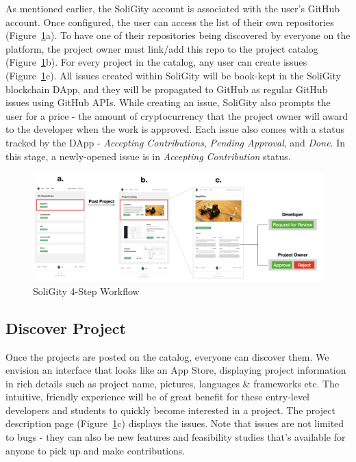 \documentclass[12pt]{article}
\renewcommand{\_}{\kern-1.5pt\textunderscore\kern-1.5pt}
\begin{document}
As mentioned earlier, the SoliGity account is associated with the user’s GitHub account. Once configured, the user can access the list of their own repositories (Figure~\ref{fig:workflow2}a). To have one of their repositories being discovered by everyone on the platform, the project owner must link/add this repo to the project catalog (Figure~\ref{fig:workflow2}b). For every project in the catalog, any user can create issues (Figure~\ref{fig:workflow2}c). All issues created within SoliGity will be book-kept in the SoliGity blockchain DApp, and they will be propagated to GitHub as regular GitHub issues using GitHub APIs. While creating an issue, SoliGity also prompts the user for a price - the amount of cryptocurrency that the project owner will award to the developer when the work is approved. Each issue also comes with a status tracked by the DApp - \textit{Accepting Contributions}, \textit{Pending Approval}, and \textit{Done}. In this stage, a newly-opened issue is in \textit{Accepting Contribution} status.


\begin{figure}[H]
	\centering
	\includegraphics[width=16.5cm]{graphs/00b. workflow.png}
	\caption{SoliGity 4-Step Workflow}
	\label{fig:workflow2}
\end{figure}

\subsection{Discover Project}

Once the projects are posted on the catalog, everyone can discover them. We envision an interface that looks like an App Store, displaying project information in rich details such as project name, pictures, languages \& frameworks etc. The intuitive, friendly experience will be of great benefit for these entry-level developers and students to quickly become interested in a project. The project description page (Figure~\ref{fig:workflow2}c) displays the issues. Note that issues are not limited to bugs - they can also be new features and feasibility studies that’s available for anyone to pick up and make contributions.
\end{document}
